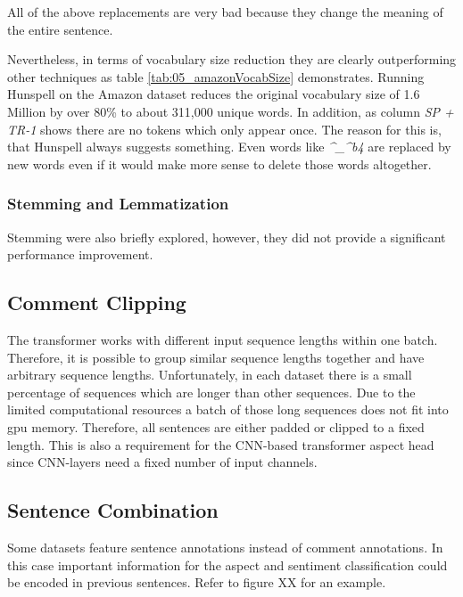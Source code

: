 All of the above replacements are very bad because they change the meaning of the entire sentence.

Nevertheless, in terms of vocabulary size reduction they are clearly outperforming other techniques as table \ref{tab:05_amazonVocabSize} demonstrates. Running Hunspell on the Amazon dataset reduces the original vocabulary size of 1.6 Million by over 80\% to about 311,000 unique words. In addition, as column \textit{SP + TR-1} shows there are no tokens which only appear once. The reason for this is, that Hunspell always suggests something. Even words like \textit{\^{}\_\^{}b4} are replaced by new words even if it would make more sense to delete those words altogether.


\subsubsection*{Stemming and Lemmatization}

Stemming were also briefly explored, however, they did not provide a significant performance improvement.

\subsection{Comment Clipping}


The transformer works with different input sequence lengths within one batch. Therefore, it is possible to group similar sequence lengths together and have arbitrary sequence lengths. Unfortunately, in each dataset there is a small percentage of sequences which are longer than other sequences. Due to the limited computational resources a batch of those long sequences  does not fit into \gls{gpu} memory. Therefore, all sentences are either padded or clipped to a fixed length. This is also a requirement for the CNN-based transformer aspect head since CNN-layers need a fixed number of input channels.

\subsection{Sentence Combination}

Some datasets feature sentence annotations instead of comment annotations. In this case important information for the aspect and sentiment classification could be encoded in previous sentences. Refer to figure XX for an example.

